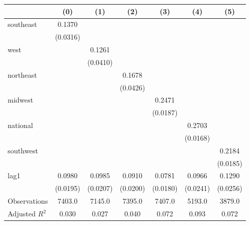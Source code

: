 \begin{tabular}{lcccccc}
\toprule
 & (0) & (1) & (2) & (3) & (4) & (5) \\
\midrule
southeast & 0.1370 &  &  &  &  &  \\
\vspace{0.2cm}
 & (0.0316) &  &  &  &  &  \\
west &  & 0.1261 &  &  &  &  \\
\vspace{0.2cm}
 &  & (0.0410) &  &  &  &  \\
northeast &  &  & 0.1678 &  &  &  \\
\vspace{0.2cm}
 &  &  & (0.0426) &  &  &  \\
midwest &  &  &  & 0.2471 &  &  \\
\vspace{0.2cm}
 &  &  &  & (0.0187) &  &  \\
national &  &  &  &  & 0.2703 &  \\
\vspace{0.2cm}
 &  &  &  &  & (0.0168) &  \\
southwest &  &  &  &  &  & 0.2184 \\
\vspace{0.2cm}
 &  &  &  &  &  & (0.0185) \\
lag1 & 0.0980 & 0.0985 & 0.0910 & 0.0781 & 0.0966 & 0.1290 \\
\vspace{0.2cm}
 & (0.0195) & (0.0207) & (0.0200) & (0.0180) & (0.0241) & (0.0256) \\
\midrule
Observations & 7403.0 & 7145.0 & 7395.0 & 7407.0 & 5193.0 & 3879.0 \\
Adjusted $R^2$ & 0.030 & 0.027 & 0.040 & 0.072 & 0.093 & 0.072 \\
\bottomrule
\end{tabular}